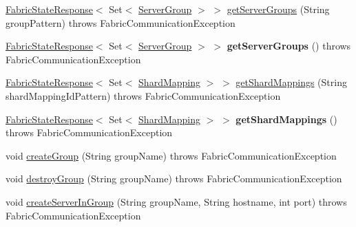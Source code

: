 \begin{DoxyCompactItemize}
\mbox{\hyperlink{classcom_1_1mysql_1_1fabric_1_1_fabric_state_response}{Fabric\+State\+Response}}$<$ Set$<$ \mbox{\hyperlink{classcom_1_1mysql_1_1fabric_1_1_server_group}{Server\+Group}} $>$ $>$ \mbox{\hyperlink{classcom_1_1mysql_1_1fabric_1_1proto_1_1xmlrpc_1_1_xml_rpc_client_a4994f6f561120609d2424ac3dd5358e7}{get\+Server\+Groups}} (String group\+Pattern)  throws Fabric\+Communication\+Exception 
\item 
\mbox{\label{classcom_1_1mysql_1_1fabric_1_1proto_1_1xmlrpc_1_1_xml_rpc_client_a6d94795852e21641cd0071a3c16c7a9c}} 
\mbox{\hyperlink{classcom_1_1mysql_1_1fabric_1_1_fabric_state_response}{Fabric\+State\+Response}}$<$ Set$<$ \mbox{\hyperlink{classcom_1_1mysql_1_1fabric_1_1_server_group}{Server\+Group}} $>$ $>$ {\bfseries get\+Server\+Groups} ()  throws Fabric\+Communication\+Exception 
\item 
\mbox{\hyperlink{classcom_1_1mysql_1_1fabric_1_1_fabric_state_response}{Fabric\+State\+Response}}$<$ Set$<$ \mbox{\hyperlink{classcom_1_1mysql_1_1fabric_1_1_shard_mapping}{Shard\+Mapping}} $>$ $>$ \mbox{\hyperlink{classcom_1_1mysql_1_1fabric_1_1proto_1_1xmlrpc_1_1_xml_rpc_client_abe45ffddd4ee9cb5dd9aa9a7b38b895c}{get\+Shard\+Mappings}} (String shard\+Mapping\+Id\+Pattern)  throws Fabric\+Communication\+Exception 
\item 
\mbox{\label{classcom_1_1mysql_1_1fabric_1_1proto_1_1xmlrpc_1_1_xml_rpc_client_afb0765944d961057580c90d54070dba9}} 
\mbox{\hyperlink{classcom_1_1mysql_1_1fabric_1_1_fabric_state_response}{Fabric\+State\+Response}}$<$ Set$<$ \mbox{\hyperlink{classcom_1_1mysql_1_1fabric_1_1_shard_mapping}{Shard\+Mapping}} $>$ $>$ {\bfseries get\+Shard\+Mappings} ()  throws Fabric\+Communication\+Exception 
\item 
void \mbox{\hyperlink{classcom_1_1mysql_1_1fabric_1_1proto_1_1xmlrpc_1_1_xml_rpc_client_a798e2b72d0dfbe29011320bc85cb7368}{create\+Group}} (String group\+Name)  throws Fabric\+Communication\+Exception 
\item 
void \mbox{\hyperlink{classcom_1_1mysql_1_1fabric_1_1proto_1_1xmlrpc_1_1_xml_rpc_client_a502a4375746c23b6a6213754daa0b02a}{destroy\+Group}} (String group\+Name)  throws Fabric\+Communication\+Exception 
\item 
void \mbox{\hyperlink{classcom_1_1mysql_1_1fabric_1_1proto_1_1xmlrpc_1_1_xml_rpc_client_a7fea61d00a4acbbc23aac53f5c108056}{create\+Server\+In\+Group}} (String group\+Name, String hostname, int port)  throws Fabric\+Communication\+Exception 

\end{DoxyCompactItemize}
